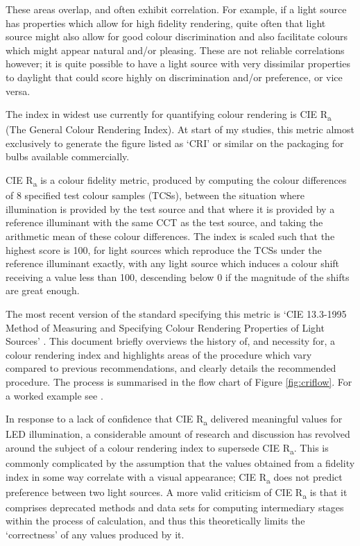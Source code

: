 These areas overlap, and often exhibit correlation. For example, if a light source has properties which allow for high fidelity rendering, quite often that light source might also allow for good colour discrimination and also facilitate colours which might appear natural and/or pleasing. These are not reliable correlations however; it is quite possible to have a light source with very dissimilar properties to daylight that could score highly on discrimination and/or preference, or vice versa.

The index in widest use currently for quantifying colour rendering is \gls{CIE} R\textsubscript{a} (The General Colour Rendering Index). At start of my studies, this metric almost exclusively to generate the figure listed as `CRI' or similar on the packaging for bulbs available commercially. %

\gls{CIE} R\textsubscript{a} is a colour fidelity metric, produced by computing the colour differences of 8 specified test colour samples (TCSs), between the situation where illumination is provided by the test source and that where it is provided by a reference illuminant with the same \gls{CCT} as the test source, and taking the arithmetic mean of these colour differences. The index is scaled such that the highest score is 100, for light sources which reproduce the TCSs under the reference illuminant exactly, with any light source which induces a colour shift receiving a value less than 100, descending below 0 if the magnitude of the shifts are great enough.

The most recent version of the standard specifying this metric is `\gls{CIE} 13.3-1995 Method of Measuring and Specifying Colour Rendering Properties of Light Sources' \citep{cie_cie_1995}. This document briefly overviews the history of, and necessity for, a colour rendering index and highlights areas of the procedure which vary compared to previous recommendations, and clearly details the recommended procedure. The process is summarised in the flow chart of Figure \ref{fig:criflow}. For a worked example see \citet[p.388]{hunt_measuring_2011}.

In response to a lack of confidence that \gls{CIE} R\textsubscript{a} delivered meaningful values for LED illumination, a considerable amount of research and discussion has revolved around the subject of a colour rendering index to supersede \gls{CIE} R\textsubscript{a}. This is commonly complicated by the assumption that the values obtained from a fidelity index in some way correlate with a visual appearance; \gls{CIE} R\textsubscript{a} does not predict preference between two light sources. A more valid criticism of \gls{CIE} R\textsubscript{a} is that it comprises deprecated methods and data sets for computing intermediary stages within the process of calculation, and thus this theoretically limits the `correctness' of any values produced by it.

